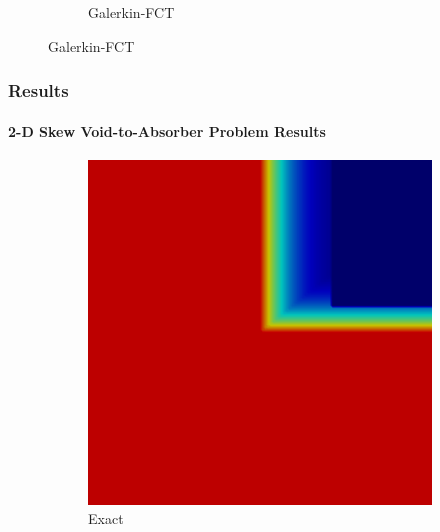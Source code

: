 \documentclass{beamer}
\begin{document}
\begin{frame}
\begin{figure}[h]
\begin{subfigure}{0.45\textwidth}
      \caption{Galerkin-FCT}
   \end{subfigure}
\end{figure}

\end{frame}
\begin{frame}
\frametitle{Results}
\framesubtitle{2-D Skew Void-to-Absorber Problem Results}

\begin{figure}[h]
   \centering
   \begin{subfigure}{0.3\textwidth}
      \includegraphics[width=\textwidth]{./figures/skew_exact.png}
      \caption{Exact}
   \end{subfigure}
   \begin{subfigure}{0.3\textwidth}

\end{subfigure}
\end{figure}
\end{frame}
\end{document}
